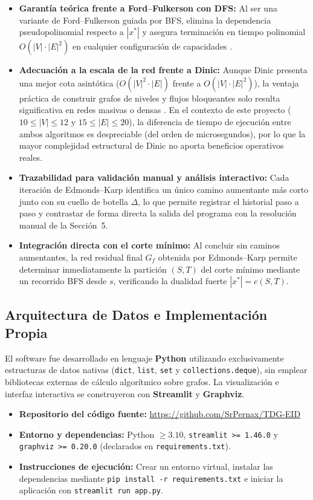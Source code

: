 \documentclass[11pt,a4paper]{article}
\begin{document}
\begin{itemize}
    \item \textbf{Garantía teórica frente a Ford--Fulkerson con DFS:} Al ser una variante de Ford--Fulkerson guiada por BFS, elimina la dependencia pseudopolinomial respecto a $|x^*|$ y asegura terminación en tiempo polinomial $O(|V| \cdot |E|^2)$ en cualquier configuración de capacidades \cite{cormen}.
    \item \textbf{Adecuación a la escala de la red frente a Dinic:} Aunque Dinic presenta una mejor cota asintótica ($O(|V|^2 \cdot |E|)$ frente a $O(|V| \cdot |E|^2)$), la ventaja práctica de construir grafos de niveles y flujos bloqueantes solo resulta significativa en redes masivas o densas \cite{ahuja}. En el contexto de este proyecto ($10 \le |V| \le 12$ y $15 \le |E| \le 20$), la diferencia de tiempo de ejecución entre ambos algoritmos es despreciable (del orden de microsegundos), por lo que la mayor complejidad estructural de Dinic no aporta beneficios operativos reales.
    \item \textbf{Trazabilidad para validación manual y análisis interactivo:} Cada iteración de Edmonds--Karp identifica un único camino aumentante más corto junto con su cuello de botella $\Delta$, lo que permite registrar el historial paso a paso y contrastar de forma directa la salida del programa con la resolución manual de la Sección~5.
    \item \textbf{Integración directa con el corte mínimo:} Al concluir sin caminos aumentantes, la red residual final $G_f$ obtenida por Edmonds--Karp permite determinar inmediatamente la partición $(S, T)$ del corte mínimo mediante un recorrido BFS desde $s$, verificando la dualidad fuerte $|x^*| = c(S, T)$.
\end{itemize}

\subsection{Arquitectura de Datos e Implementación Propia}
El software fue desarrollado en lenguaje \textbf{Python} utilizando exclusivamente estructuras de datos nativas (\texttt{dict}, \texttt{list}, \texttt{set} y \texttt{collections.deque}), sin emplear bibliotecas externas de cálculo algorítmico sobre grafos. La visualización e interfaz interactiva se construyeron con \textbf{Streamlit} y \textbf{Graphviz}.

\begin{itemize}
    \item \textbf{Repositorio del código fuente:} \url{https://github.com/SrPernax/TDG-EID}
    \item \textbf{Entorno y dependencias:} Python $\ge 3.10$, \texttt{streamlit >= 1.46.0} y \texttt{graphviz >= 0.20.0} (declarados en \texttt{requirements.txt}).
    \item \textbf{Instrucciones de ejecución:} Crear un entorno virtual, instalar las dependencias mediante \texttt{pip install -r requirements.txt} e iniciar la aplicación con \texttt{streamlit run app.py}.
\end{itemize}
\end{document}
